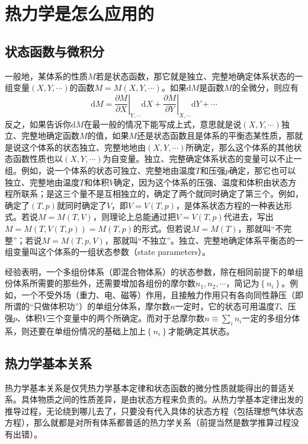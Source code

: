 \documentclass[main.tex]{subfiles}
\begin{document}
\section{热力学是怎么应用的}\label{I.2 pratical_thermodynamics}
\subsection{状态函数与微积分}
一般地，某体系的性质$M$若是状态函数，那它就是独立、完整地确定体系状态的一组变量$\left(X,Y,\cdots\right)$的函数$M=M\left(X,Y,\cdots\right)$。如果$\mathrm{d}M$是函数$M$的全微分，则应有
\[\mathrm{d}M=\left.\frac{\partial M}{\partial X}\right|_{Y,\cdots}\mathrm{d}X+\left.\frac{\partial M}{\partial Y}\right|_{X,\cdots}\mathrm{d}Y+\cdots\]
反之，如果告诉你$\mathrm{d}M$在最一般的情况下能写成上式，意思就是说$\left(X,Y,\cdots\right)$独立、完整地确定函数$M$的值，如果$M$还是状态函数且是体系的平衡态某性质，那就是说这个体系的状态独立、完整地地由$\left(X,Y,\cdots\right)$所确定，那么这个体系的其他状态函数性质也以$\left(X,Y,\cdots\right)$为自变量。独立、完整确定体系状态的变量可以不止一组。例如，说一个体系的状态可独立、完整地由温度$T$和压强$p$确定，那它也可以独立、完整地由温度$T$和体积$V$确定，因为这个体系的压强、温度和体积由状态方程所联系；是这三个量不是互相独立的，确定了两个就同时确定了第三个。例如，确定了$\left(T,p\right)$就同时确定了$V$，即$V=V\left(T,p\right)$，是体系状态方程的一种表达形式。若说$M=M\left(T,V\right)$，则理论上总能通过把$V=V\left(T,p\right)$代进去，写出$M=M\left(T,V\left(T,p\right)\right)=M\left(T,p\right)$的形式。但若说$M=M\left(T\right)$，那就叫“不完整”；若说$M=M\left(T,p,V\right)$，那就叫“不独立”。独立、完整地确定体系平衡态的一组变量叫这个体系的一组状态参数（state parameters）。

经验表明，一个多组份体系（即混合物体系）的状态参数，除在相同前提下的单组份体系所需要的那些外，还需要增加各组份的摩尔数$n_1,n_2,\cdots$，简记为$\left\{n_i\right\}$。例如，一个不受外场（重力、电、磁等）作用，且接触力作用只有各向同性静压（即所谓的“只做体积功”）的单组分体系，摩尔数$n$一定时，它的状态可用温度$T$、压强$p$、体积$V$三个变量中的两个所确定。而对于总摩尔数$n\equiv\sum_in_i$一定的多组分体系，则还要在单组份情况的基础上加上$\left\{n_i\right\}$才能确定其状态。

\subsection{热力学基本关系}
热力学基本关系是仅凭热力学基本定律和状态函数的微分性质就能得出的普适关系。具体物质之间的性质差异，是由状态方程来负责的。从热力学基本定律出发的推导过程，无论绕到哪儿去了，只要没有代入具体的状态方程（包括理想气体状态方程），那么就都是对所有体系都普适的热力学关系（前提当然是数学推算过程没有出错）。
\end{document}
